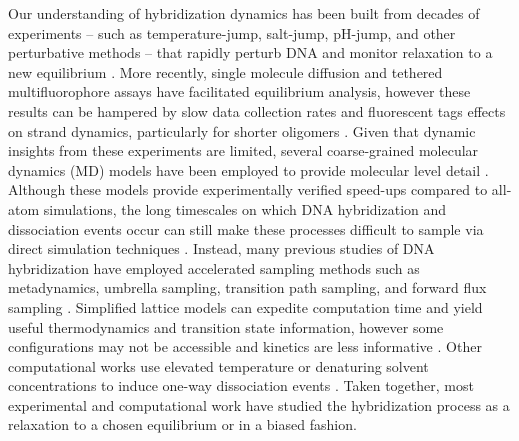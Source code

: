 \documentclass[journal=jpcbfk,manuscript=article]{achemso}
\begin{document}
Our understanding of hybridization dynamics has been built from decades of experiments -- such as temperature-jump, salt-jump, pH-jump, and other perturbative methods -- that rapidly perturb DNA and monitor relaxation to a new equilibrium \citep{Morrison1993SensitiveSolution, Wetmur1968KineticsDNA, Craig1971ElaxationOligon, Porschke1973ThermodynamicsPairs, Williams1989LaserDGCATGC, Narayanan2012ExploringMixing, Chen2007InfluenceHybridization, Sanstead2018DirectDehybridization}. More recently, single molecule diffusion and tethered multifluorophore assays have facilitated equilibrium analysis, however these results can be hampered by slow data collection rates and fluorescent tags effects on strand dynamics, particularly for shorter oligomers \citep{Liu20173DSolution,  Schickinger2018TetheredHelices, Chen2008Base-by-baseSpectroscopy, Dupuis2013Single-moleculeHelices, Morrison1993SensitiveSolution}. Given that dynamic insights from these experiments are limited, several coarse-grained molecular dynamics (MD) models have been employed to provide molecular level detail \citep{Romano2013DNADependence, Hinckley2013AnHybridization, Maciejczyk2014DNAModel, Markegard2015}. Although these models provide experimentally verified speed-ups compared to all-atom simulations, the long timescales on which DNA hybridization and dissociation events occur can still make these processes difficult to sample via direct simulation techniques \citep{Phys2014}. Instead, many previous studies of DNA hybridization have employed accelerated sampling methods such as metadynamics, umbrella sampling,  transition path sampling, and forward flux sampling \citep{Schmitt2013ExploringSurface, Sambriski2009,  Hoefert2011MolecularOligonucleotides, Romano2013DNADependence}. Simplified lattice models can expedite computation time and yield useful thermodynamics and transition state information, however some configurations may not be accessible and kinetics are less informative \citep{Araque2016LatticeCooperativity, Phys2019}. Other computational works use elevated temperature or denaturing solvent concentrations to induce one-way dissociation events \citep{Wong2008TheSimulations, Perez2010Real-timeUnfolding}. Taken together, most experimental and computational work have studied the hybridization process as a relaxation to a chosen equilibrium or in a biased fashion.
\end{document}
